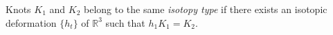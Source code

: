 Knots $K_1$ and $K_2$ belong to the same \textit{isotopy type} if there exists an isotopic deformation $\{h_t\}$ of $\mathbb{R}^3$ such that $h_1 K_1 = K_2$.
